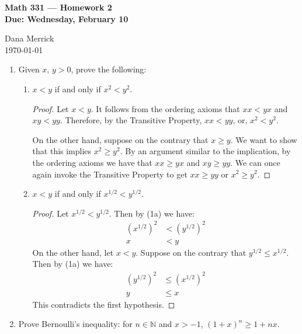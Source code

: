 \documentclass[12pt]{amsart}
\begin{document}
\thispagestyle{empty}

\begin{center}
{\bf Math 331  --- Homework 2 \\
Due:  Wednesday, February 10}
\end{center}

\bigskip

\noindent
Dana Merrick \\
\today

\bigskip

\begin{enumerate}

\setlength{\itemsep}{6pt}

\item  Given $x,\,y>0$,  prove the following:

\begin{enumerate}
%
\item $x<y$ if and only if $x^2<y^2$.

\begin{proof}
Let $x<y$. It follows from the ordering axioms that $xx<yx$ and $xy<yy$. Therefore, by the Transitive Property, $xx<yy$, or, $x^2 < y^2$.

On the other hand, suppose on the contrary that $x\geq y$. We want to show that this implies $x^2\geq y^2$. By an argument similar to the implication, by the ordering axioms we have that $xx\geq yx$ and $xy\geq yy$. We can once again invoke the Transitive Property to get $xx\geq yy$ or $x^2\geq y^2$.
\end{proof}

\item $x<y$ if and only if   $x^{1/2}<y^{1/2}$.

\begin{proof}
Let $x^{1/2}<y^{1/2}$. Then by (1a) we have:
\begin{align*}
{(x^{1/2})}^2& < {(y^{1/2})}^2 \\
x& < y
\end{align*}
On the other hand, let $x<y$. Suppose on the contrary that $y^{1/2} \leq x^{1/2}$. Then by (1a) we have:
\begin{align*}
{(y^{1/2})}^2& \leq {(x^{1/2})}^2 \\
y& \leq x
\end{align*}
This contradicts the first hypothesis.
\end{proof}

\end{enumerate}

\item Prove Bernoulli's inequality:   for $n\in \mathbb N$ and $x>-1$, $(1+x)^n\geq 1+nx$.


\end{enumerate}
\end{document}
